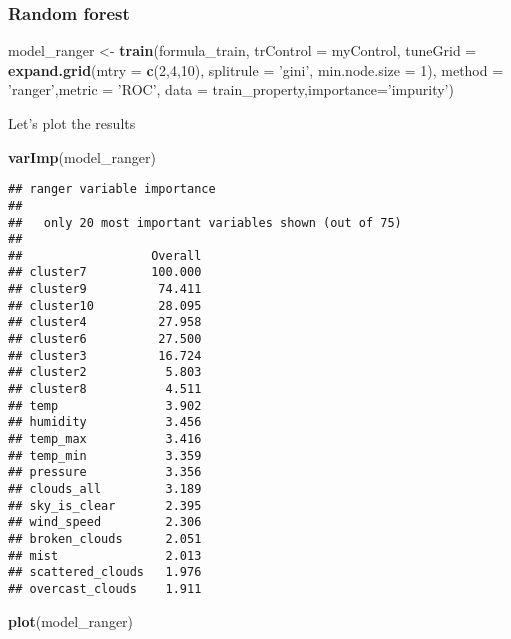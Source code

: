 \documentclass[]{article}
\newenvironment{Shaded}{\begin{snugshade}}{\end{snugshade}}
\newcommand{\KeywordTok}[1]{\textcolor[rgb]{0.13,0.29,0.53}{\textbf{#1}}}
\newcommand{\DataTypeTok}[1]{\textcolor[rgb]{0.13,0.29,0.53}{#1}}
\newcommand{\DecValTok}[1]{\textcolor[rgb]{0.00,0.00,0.81}{#1}}
\newcommand{\StringTok}[1]{\textcolor[rgb]{0.31,0.60,0.02}{#1}}
\newcommand{\NormalTok}[1]{#1}
\begin{document}
\subsubsection{Random forest}\label{random-forest}

\begin{Shaded}
\begin{Highlighting}[]
\NormalTok{model_ranger <-}\StringTok{ }\KeywordTok{train}\NormalTok{(formula_train, }\DataTypeTok{trControl =}\NormalTok{ myControl, }\DataTypeTok{tuneGrid =} \KeywordTok{expand.grid}\NormalTok{(}\DataTypeTok{mtry =} \KeywordTok{c}\NormalTok{(}\DecValTok{2}\NormalTok{,}\DecValTok{4}\NormalTok{,}\DecValTok{10}\NormalTok{), }\DataTypeTok{splitrule =} \StringTok{'gini'}\NormalTok{, }\DataTypeTok{min.node.size =} \DecValTok{1}\NormalTok{),}
                      \DataTypeTok{method =} \StringTok{'ranger'}\NormalTok{,}\DataTypeTok{metric =} \StringTok{'ROC'}\NormalTok{, }\DataTypeTok{data =}\NormalTok{ train_property,}\DataTypeTok{importance=}\StringTok{'impurity'}\NormalTok{)}
\end{Highlighting}
\end{Shaded}

Let's plot the results

\begin{Shaded}
\begin{Highlighting}[]
\KeywordTok{varImp}\NormalTok{(model_ranger)}
\end{Highlighting}
\end{Shaded}

\begin{verbatim}
## ranger variable importance
## 
##   only 20 most important variables shown (out of 75)
## 
##                  Overall
## cluster7         100.000
## cluster9          74.411
## cluster10         28.095
## cluster4          27.958
## cluster6          27.500
## cluster3          16.724
## cluster2           5.803
## cluster8           4.511
## temp               3.902
## humidity           3.456
## temp_max           3.416
## temp_min           3.359
## pressure           3.356
## clouds_all         3.189
## sky_is_clear       2.395
## wind_speed         2.306
## broken_clouds      2.051
## mist               2.013
## scattered_clouds   1.976
## overcast_clouds    1.911
\end{verbatim}

\begin{Shaded}
\begin{Highlighting}[]
\KeywordTok{plot}\NormalTok{(model_ranger)}
\end{Highlighting}
\end{Shaded}
\end{document}
